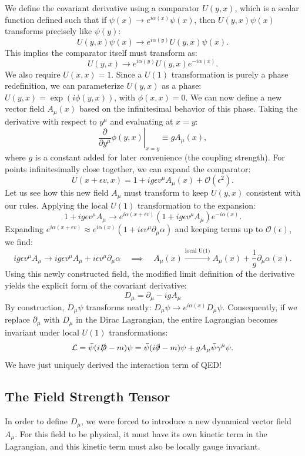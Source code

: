 We define the covariant derivative using a comparator $U(y,x)$, which is a scalar function defined such that if $\psi(x) \to e^{i\alpha(x)}\psi(x)$, then $U(y,x)\psi(x)$ transforms precisely like $\psi(y)$:
\[
    U(y,x)\psi(x) \to e^{i\alpha(y)}U(y,x)\psi(x).
\]
This implies the comparator itself must transform as:
\[
    U(y,x) \to e^{i\alpha(y)}U(y,x)e^{-i\alpha(x)}.
\]
We also require $U(x,x) = 1$. Since a $U(1)$ transformation is purely a phase redefinition, we can parameterize $U(y,x)$ as a phase: $U(y,x) = \exp(i\phi(y,x))$, with $\phi(x,x)=0$.
We can now define a new vector field $A_\mu(x)$ based on the infinitesimal behavior of this phase. Taking the derivative with respect to $y^\mu$ and evaluating at $x=y$:
\[
    \left. \frac{\partial}{\partial y^\mu} \phi(y,x) \right|_{x=y} \equiv g A_\mu(x),
\]
where $g$ is a constant added for later convenience (the coupling strength). For points infinitesimally close together, we can expand the comparator:
\[
    U(x+\epsilon v, x) = 1 + ig\epsilon v^\mu A_\mu(x) + \mathcal{O}(\epsilon^2).
\]
Let us see how this new field $A_\mu$ must transform to keep $U(y,x)$ consistent with our rules. Applying the local $U(1)$ transformation to the expansion:
\[
    1 + ig\epsilon v^\mu A_\mu \to e^{i\alpha(x+\epsilon v)} (1 + ig\epsilon v^\mu A_\mu) e^{-i\alpha(x)}.
\]
Expanding $e^{i\alpha(x+\epsilon v)} \approx e^{i\alpha(x)} (1 + i\epsilon v^\mu \partial_\mu \alpha)$ and keeping terms up to $\mathcal{O}(\epsilon)$, we find:
\[
    ig\epsilon v^\mu A_\mu \to ig\epsilon v^\mu A_\mu + i\epsilon v^\mu \partial_\mu \alpha \quad \implies \quad A_\mu(x) \xrightarrow{\text{local U(1)}} A_\mu(x) + \frac{1}{g}\partial_\mu \alpha(x).
\]
Using this newly constructed field, the modified limit definition of the derivative yields the explicit form of the covariant derivative:
\[
    D_\mu = \partial_\mu - ig A_\mu
\]
By construction, $D_\mu \psi$ transforms neatly: $D_\mu \psi \to e^{i\alpha(x)}D_\mu \psi$. Consequently, if we replace $\partial_\mu$ with $D_\mu$ in the Dirac Lagrangian, the entire Lagrangian becomes invariant under local $U(1)$ transformations:
\[
    \mathcal{L} = \bar{\psi}(i\slashed{D} - m)\psi = \bar{\psi}(i\slashed{\partial} - m)\psi + g A_\mu \bar{\psi}\gamma^\mu\psi.
\]
We have just uniquely derived the interaction term of QED!

\subsection{The Field Strength Tensor}
In order to define $D_\mu$, we were forced to introduce a new dynamical vector field $A_\mu$. For this field to be physical, it must have its own kinetic term in the Lagrangian, and this kinetic term must also be locally gauge invariant.

